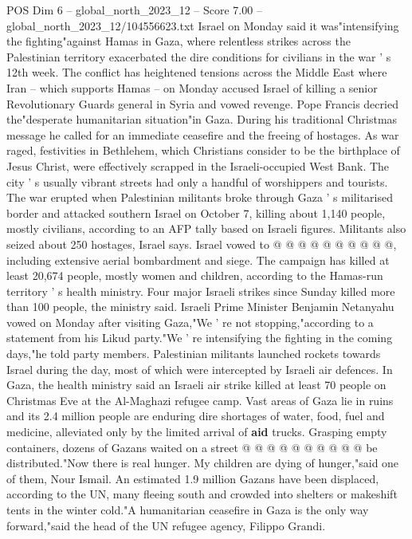 \begin{textsample}{POS Dim 6 – global\_north\_2023\_12 – Score 7.00 – global\_north\_2023\_12/104556623.txt}  \label{ex:f6_pos_187}
Israel on Monday said it was"intensifying the fighting"against Hamas in Gaza, where relentless strikes across the Palestinian territory exacerbated the dire conditions for civilians in the war ' s 12th week.
The conflict has heightened tensions across the Middle East where Iran -- which supports Hamas -- on Monday accused Israel of killing a senior Revolutionary Guards general in Syria and vowed revenge.
Pope Francis decried the"desperate humanitarian situation"in Gaza.
During his traditional Christmas message he called for an immediate ceasefire and the freeing of hostages.
As war raged, festivities in Bethlehem, which Christians consider to be the birthplace of Jesus Christ, were effectively scrapped in the Israeli-occupied West Bank.
The city ' s usually vibrant streets had only a handful of worshippers and tourists.
The war erupted when Palestinian militants broke through Gaza ' s militarised border and attacked southern Israel on October 7, killing about 1,140 people, mostly civilians, according to an AFP tally based on Israeli figures.
Militants also seized about 250 hostages, Israel says.
Israel vowed to @ @ @ @ @ @ @ @ @ @, including extensive aerial bombardment and siege.
The campaign has killed at least 20,674 people, mostly women and children, according to the Hamas-run territory ' s health ministry.
Four major Israeli strikes since Sunday killed more than 100 people, the ministry said.
Israeli Prime Minister Benjamin Netanyahu vowed on Monday after visiting Gaza,"We ' re not stopping,"according to a statement from his Likud party."We ' re intensifying the fighting in the coming days,"he told party members.
Palestinian militants launched rockets towards Israel during the day, most of which were intercepted by Israeli air defences.
In Gaza, the health ministry said an Israeli air strike killed at least 70 people on Christmas Eve at the Al-Maghazi refugee camp.
Vast areas of Gaza lie in ruins and its 2.4 million people are enduring dire shortages of water, food, fuel and medicine, alleviated only by the limited arrival of \textbf{aid} trucks.
Grasping empty containers, dozens of Gazans waited on a street @ @ @ @ @ @ @ @ @ @ be distributed."Now there is real hunger.
My children are dying of hunger,"said one of them, Nour Ismail.
An estimated 1.9 million Gazans have been displaced, according to the UN, many fleeing south and crowded into shelters or makeshift tents in the winter cold."A humanitarian ceasefire in Gaza is the only way forward,"said the head of the UN refugee agency, Filippo Grandi.

\end{textsample}
